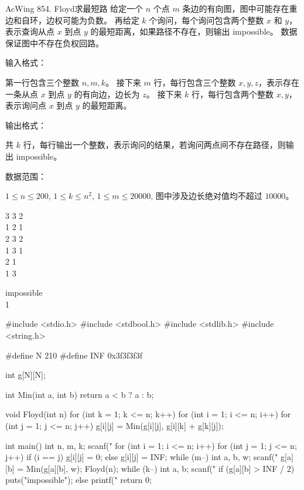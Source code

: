 \begin{titledbox}{AcWing 854. Floyd求最短路}
    给定一个 $n$ 个点 $m$ 条边的有向图，图中可能存在重边和自环，边权可能为负数。 再给定 $k$ 个询问，每个询问包含两个整数 $x$ 和 $y$，表示查询从点 $x$ 到点 $y$ 的最短距离，如果路径不存在，则输出 impossible。 数据保证图中不存在负权回路。

    输入格式：

    第一行包含三个整数 $n,m,k$。 接下来 $m$ 行，每行包含三个整数 $x,y,z$，表示存在一条从点 $x$ 到点 $y$ 的有向边，边长为 $z$。 接下来 $k$ 行，每行包含两个整数 $x,y$，表示询问点 $x$ 到点 $y$ 的最短距离。

    输出格式：

    共 $k$ 行，每行输出一个整数，表示询问的结果，若询问两点间不存在路径，则输出 impossible。

    数据范围：

    $1 \le n \le 200$, $1 \le k \le n^2$, $1 \le m \le 20000$, 图中涉及边长绝对值均不超过 $10000$。

    \begin{inputblock}
        3 3 2 \\
        1 2 1 \\
        2 3 2 \\
        1 3 1 \\
        2 1 \\
        1 3
    \end{inputblock}
    \begin{outputblock}
        impossible \\
        1
    \end{outputblock}
\end{titledbox}

\begin{mycpptwocol}[Floyd]
    #include <stdio.h>
    #include <stdbool.h>
    #include <stdlib.h>
    #include <string.h>

    #define N 210
    #define INF 0x3f3f3f3f

    int g[N][N];

    int Min(int a, int b) {
        return a < b ? a : b;
    }

    void Floyd(int n) {
        for (int k = 1; k <= n; k++) {
            for (int i = 1; i <= n; i++) {
                for (int j = 1; j <= n; j++) {
                    g[i][j] = Min(g[i][j], g[i][k] + g[k][j]);
                }
            }
        }
    }

    int main() {
        int n, m, k;
        scanf("%
        for (int i = 1; i <= n; i++) {
            for (int j = 1; j <= n; j++) {
                if (i == j) {
                    g[i][j] = 0;
                } else {
                    g[i][j] = INF;
                }
            }
        }
        while (m--) {
            int a, b, w;
            scanf("%
            g[a][b] = Min(g[a][b], w);
        }
        Floyd(n);
        while (k--) {
            int a, b;
            scanf("%
            if (g[a][b] > INF / 2) {
                puts("impossible");
            } else {
                printf("%
            }
        }
        return 0;
    }
\end{mycpptwocol}


